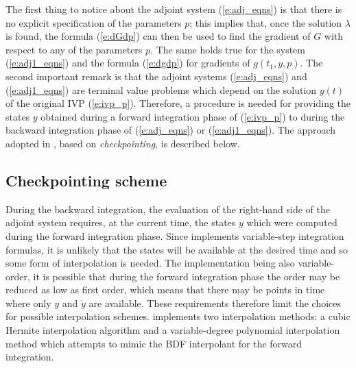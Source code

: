 The first thing to notice about the adjoint system (\ref{e:adj_eqns}) is that there
is no explicit specification of the parameters $p$; this implies that, once the
solution $\lambda$ is found, the formula (\ref{e:dGdp}) can then be used to find
the gradient of $G$ with respect to any of the parameters $p$. The same holds true
for the system (\ref{e:adj1_eqns}) and the formula (\ref{e:dgdp}) for gradients of
$g(t_1,y,p)$.  The second important remark is that the adjoint systems
(\ref{e:adj_eqns}) and (\ref{e:adj1_eqns}) are terminal value problems which depend
on the solution $y(t)$ of the original IVP (\ref{e:ivp_p}). Therefore, a procedure
is needed for providing the states $y$ obtained during a forward integration phase
of (\ref{e:ivp_p}) to {\cvodes} during the backward integration phase of
(\ref{e:adj_eqns}) or (\ref{e:adj1_eqns}).  The approach adopted in {\cvodes},
based on {\em checkpointing}, is described below.

\subsection{Checkpointing scheme}\label{ss:checkpointing}
During the backward integration, the evaluation of the right-hand side 
of the adjoint system requires, at the current time, the states $y$ which
were computed during the forward integration phase.
Since {\cvodes} implements variable-step integration formulas,
it is unlikely that the states will be available at the desired time and
so some form of interpolation is needed. The {\cvodes} implementation
being also variable-order, it is possible that during the forward
integration phase the order may be reduced as low as first order,
which means that there may be points in time where only $y$ and ${\dot y}$
are available. These requirements therefore limit the choices for possible
interpolation schemes.
{\cvodes} implements two interpolation methods: a cubic Hermite interpolation
algorithm and a variable-degree polynomial interpolation method which attempts 
to mimic the BDF interpolant for the forward integration.

